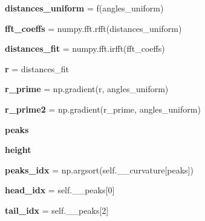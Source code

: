 \begin{DoxyCompactItemize}
{\bfseries distances\+\_\+uniform} = f(angles\+\_\+uniform)
\item 
\mbox{\label{class_boundary_1_1_boundary_aad5b2ea9aae5c846b79dd65f7b8a1417}} 
{\bfseries fft\+\_\+coeffs} = numpy.\+fft.\+rfft(distances\+\_\+uniform)
\item 
\mbox{\label{class_boundary_1_1_boundary_a35791c4d58208a174d8ace50d1b844fa}} 
{\bfseries distances\+\_\+fit} = numpy.\+fft.\+irfft(fft\+\_\+coeffs)
\item 
\mbox{\label{class_boundary_1_1_boundary_a3ac31f3884f84d0e711cc6b5bdf8a7cb}} 
{\bfseries r} = distances\+\_\+fit
\item 
\mbox{\label{class_boundary_1_1_boundary_a431c9152b9c0fbe28536580602c61772}} 
{\bfseries r\+\_\+prime} = np.\+gradient(r, angles\+\_\+uniform)
\item 
\mbox{\label{class_boundary_1_1_boundary_a98cda9773d3e9165f6380f91a2ffb961}} 
{\bfseries r\+\_\+prime2} = np.\+gradient(r\+\_\+prime, angles\+\_\+uniform)
\item 
\mbox{\label{class_boundary_1_1_boundary_ad6ac7391805fb02a6a94db934f2ce707}} 
{\bfseries peaks}
\item 
\mbox{\label{class_boundary_1_1_boundary_abc46419c4b0645e52777659f4e001369}} 
{\bfseries height}
\item 
\mbox{\label{class_boundary_1_1_boundary_a75ebba8c5b2f3db26c58a2aeab489c5c}} 
{\bfseries peaks\+\_\+idx} = np.\+argsort(self.\+\_\+\+\_\+curvature\mbox{[}peaks\mbox{]})
\item 
\mbox{\label{class_boundary_1_1_boundary_ae89b486276c03fd46c6453d6048042a1}} 
{\bfseries head\+\_\+idx} = self.\+\_\+\+\_\+peaks\mbox{[}0\mbox{]}
\item 
\mbox{\label{class_boundary_1_1_boundary_ab7f2a81e670bb7a54b54513bf42976d6}} 
{\bfseries tail\+\_\+idx} = self.\+\_\+\+\_\+peaks\mbox{[}2\mbox{]}

\end{DoxyCompactItemize}

